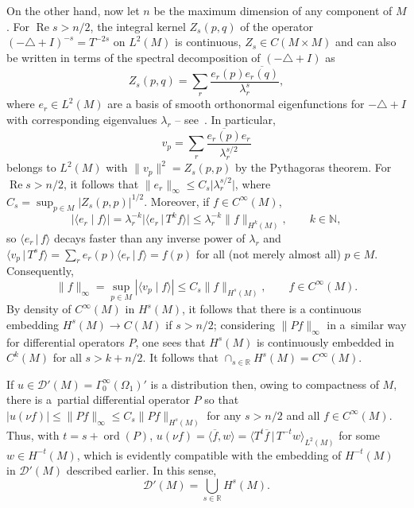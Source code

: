 \documentclass[11pt]{article}
\numberwithin{equation}{section}
\numberwithin{equation}{section}
\newcommand{\RR}{{\mathbb R}}
\newcommand{\NN}{{\mathbb N}}
\newcommand{\GoinX}[1]{\Gamma_0^\infty({#1})}
\newcommand{\DD}{{\mathscr D}}
\renewcommand{\Re}{\operatorname{Re}}
\newcommand{\ip}[2]{{\big\langle #1 \, \big|\, #2\big\rangle}}
\begin{document}
 On the other hand, now let $n$ be the maximum dimension of any component of $M$.
 For $\Re s>n/2$, the integral kernel $Z_s(p,q)$ of the operator $(-\triangle+I)^{-s}=T^{-2s}$ on $L^2(M)$ is continuous, $Z_s\in C(M\times M)$ and can also be written
 in terms of the spectral decomposition of
 $(-\triangle+I)$ as
 \begin{equation*}
 	Z_s(p,q) = \sum_{r} \frac{e_r(p)\overline{e_r(q)}}{\lambda_r^{s}},
 \end{equation*}
 where $e_r\in L^2(M)$ are a basis of smooth orthonormal eigenfunctions for $-\triangle+I$ with corresponding eigenvalues $\lambda_r$ -- see~\cite{Seeley:1967}. In particular,
 \begin{equation*}
 	v_p = \sum_{r} \frac{\overline{e_r(p)}e_r}{\lambda_r^{s/2}}
 \end{equation*}
 belongs to $L^2(M)$ with $\|v_p\|^2 = Z_s(p,p)$ by the Pythagoras theorem.
 For $\Re s>n/2$, it follows that $\|e_r\|_\infty \le C_s\big|\lambda_r^{s/2}\big|$, where $C_s=\sup_{p\in M}|Z_s(p,p)|^{1/2}$. Moreover, if $f\in C^\infty(M)$,
 \begin{equation*}
 	|\langle e_r \mid f \rangle|=\lambda_r^{-k}\big|\ip{e_r}{T^k f}\big|\le \lambda^{-k}_r\|f\|_{H^k(M)},\qquad k\in\NN,
 \end{equation*}
 so $\ip{e_r}{f}$ decays faster than any inverse power of $\lambda_r$ and
 $\ip{v_p}{T^s f} = \sum_r e_r(p)\ip{e_r}{f}= f(p)$ for all (not merely almost all) $p\in M$. Consequently,
 \begin{equation*}
 	\|f\|_\infty =\sup_{p\in M} |\langle v_p \mid f \rangle|\le C_s \|f\|_{H^s(M)}, \qquad f\in C^\infty(M).
 \end{equation*}
 By density of $C^\infty(M)$ in $H^s(M)$, it follows
 that there is a continuous embedding $H^s(M)\to C(M)$ if $s>n/2$; considering $\|Pf\|_\infty$ in a~similar way for differential operators $P$, one sees that $H^s(M)$ is continuously embedded in $C^k(M)$ for all $s>k+n/2$. It follows that $\cap_{s\in\RR} H^s(M)=C^\infty(M)$.


 If $u\in \DD'(M)= \GoinX{\Omega_1}'$ is a distribution then, owing to compactness of $M$, there is a~partial differential operator $P$ so that $|u(\nu f)|\le \|Pf\|_\infty \le C_s \|Pf\|_{H^s(M)}$ for any $s>n/2$ and all $f\in C^\infty(M)$. Thus, with $t=s+\operatorname{ord} (P)$, $u(\nu f)= \big\langle \overline{f},w\big\rangle= \ip{T^t \overline{f}}{T^{-t}w}_{L^2(M)}$ for some $w\in H^{-t}(M)$, which is evidently compatible with the embedding of $H^{-t}(M)$ in $\DD'(M)$
 described earlier. In this sense,
 \begin{equation*}
 	\DD'(M) = \bigcup_{s\in\RR} H^{s}(M).
 \end{equation*}
\end{document}

